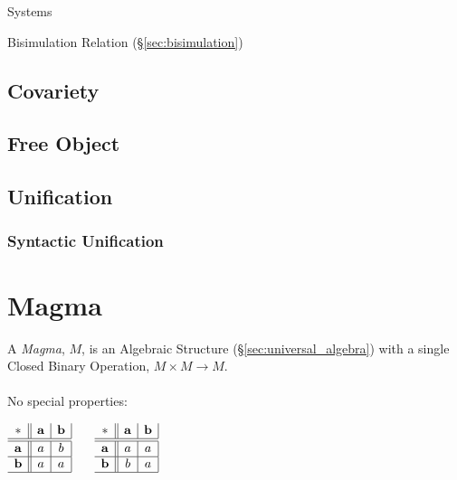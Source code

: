 \cite{rutten00}

Systems

Bisimulation Relation (\S\ref{sec:bisimulation})



\subsection{Covariety}\label{sec:covariety}

\subsection{Free Object}\label{sec:free_object}

\subsection{Unification}\label{sec:unification}

\subsubsection{Syntactic Unification}\label{sec:syntactic_unification}



\section{Magma}\label{sec:magma}

A \emph{Magma}, $M$, is an Algebraic Structure
(\S\ref{sec:universal_algebra}) with a single Closed Binary Operation,
$M \times M \rightarrow M$.
\\ \\
No special properties:

$\begin{array}{c||c|c|}
  * & \mathbf{a} & \mathbf{b} \\ \hline \hline
  \mathbf{a} & a & b \\ \hline
  \mathbf{b} & a & a \\ \hline
\end{array}$ $\quad$ $\begin{array}{c||c|c|}
  * & \mathbf{a} & \mathbf{b} \\ \hline \hline
  \mathbf{a} & a & a \\ \hline
  \mathbf{b} & b & a \\ \hline
\end{array}$ \\ \hfill \\

